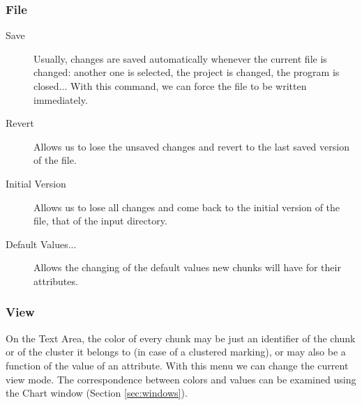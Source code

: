 \documentclass{article}
\begin{document}
\subsubsection{File}
\begin{description}
\item[Save] Usually, changes are saved automatically whenever the
current file is changed: another one is selected, the project is
changed, the program is closed... With this command, we can force the
file to be written immediately.
\item[Revert] Allows us to lose the unsaved changes and revert to the
last saved version of the file.
\item[Initial Version] Allows us to lose all changes and come back to
the initial version of the file, that of the input directory.
\item[Default Values...] Allows the changing of the default values new
chunks will have for their attributes.
\end{description}

\subsubsection{View}
\label{sec:view}
On the Text Area, the color of every chunk may be just an identifier
of the chunk or of the cluster it belongs to (in case of a clustered
marking), or may also be a function of the value of an attribute. With
this menu we can change the current view mode. The correspondence
between colors and values can be examined using the Chart window
(Section \ref{sec:windows}).
\end{document}
